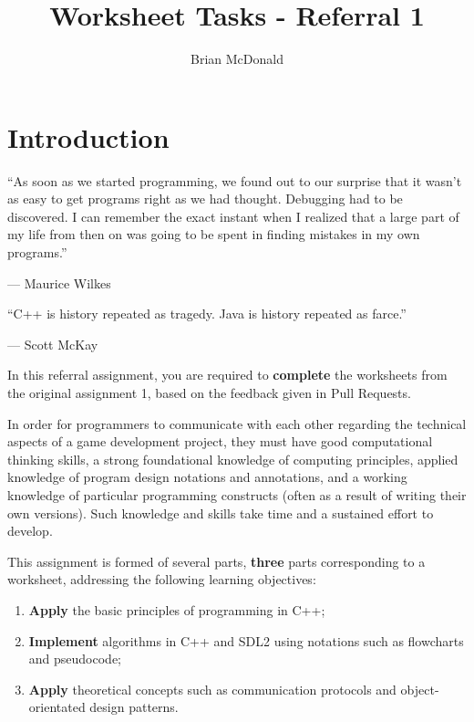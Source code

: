 \documentclass{../../../fal_assignment}
\title{Worksheet Tasks - Referral 1}
\author{Brian McDonald}
\begin{document}
	
	\maketitle
	
	\section*{Introduction}
	
	\begin{marginquote}
		``As soon as we started programming, we found out to our surprise that it wasn't as easy to get programs right as we had thought. Debugging had to be discovered. I can remember the exact instant when I realized that a large part of my life from then on was going to be spent in finding mistakes in my own programs.''
		\par --- Maurice Wilkes
		\marginquoterule
		\par ``C++ is history repeated as tragedy. Java is history repeated as farce.''
		\par --- Scott McKay
	\end{marginquote}
	
	In this referral assignment, you are required to \textbf{complete} the worksheets from the original assignment 1, based on the feedback given in Pull Requests.
	
	In order for programmers to communicate with each other regarding the technical aspects of a game development project, they must have good computational thinking skills, a strong foundational knowledge of computing principles, applied knowledge of program design notations and annotations, and a working knowledge of particular programming constructs (often as a result of writing their own versions). Such knowledge and skills take time and a sustained effort to develop.
	
	This assignment is formed of several parts, \textbf{three} parts corresponding to a worksheet, addressing the following learning objectives:
	
	\begin{enumerate}[label=(\Alph*)]
		\item \textbf{Apply} the basic principles of programming in C++;
		\item \textbf{Implement} algorithms in C++ and SDL2 using notations such as flowcharts and pseudocode;
		\item \textbf{Apply} theoretical concepts such as communication protocols and object-orientated design patterns.
	\end{enumerate}
	
\end{document}
